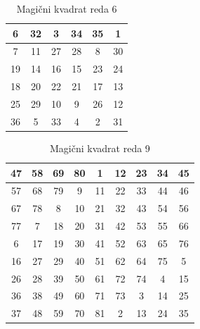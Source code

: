 \documentclass[a4paper,12pt]{article}
\newenvironment{magic}[3]{\begin{table}[!ht]
   \centering
   \caption{#1}
   \label{#2}
   \large
   \begin{tabular}{|*{#3}{c|}}
   \hline}{\end{tabular}
   \normalsize
\end{table}}
\theoremstyle{definition}
\theoremstyle{plain}
\begin{document}
\begin{magic}{Magični kvadrat reda 6}{table:mag6}{6}
    6 & 32 &  3 & 34 & 35 &  1 \\\hline
    7 & 11 & 27 & 28 &  8 & 30 \\\hline
   19 & 14 & 16 & 15 & 23 & 24 \\\hline
   18 & 20 & 22 & 21 & 17 & 13 \\\hline
   25 & 29 & 10 &  9 & 26 & 12 \\\hline
   36 &  5 & 33 &  4 &  2 & 31 \\\hline
\end{magic}

\begin{magic}{Magični kvadrat reda 9}{table:mag9}{9}
   47 & 58 & 69 & 80 &  1 & 12 & 23 & 34 & 45 \\\hline
   57 & 68 & 79 &  9 & 11 & 22 & 33 & 44 & 46 \\\hline
   67 & 78 &  8 & 10 & 21 & 32 & 43 & 54 & 56 \\\hline
   77 &  7 & 18 & 20 & 31 & 42 & 53 & 55 & 66 \\\hline
    6 & 17 & 19 & 30 & 41 & 52 & 63 & 65 & 76 \\\hline
   16 & 27 & 29 & 40 & 51 & 62 & 64 & 75 &  5 \\\hline
   26 & 28 & 39 & 50 & 61 & 72 & 74 &  4 & 15 \\\hline
   36 & 38 & 49 & 60 & 71 & 73 &  3 & 14 & 25 \\\hline
   37 & 48 & 59 & 70 & 81 &  2 & 13 & 24 & 35 \\\hline
\end{magic}

\newpage




\end{document}
